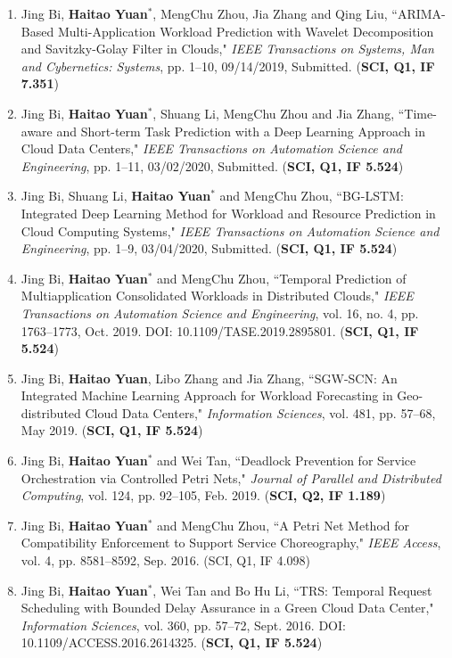 \documentclass[margin,line]{res}
\begin{document}
\begin{resume}
\begin{enumerate}
\item Jing Bi, \textbf{Haitao Yuan$^{*}$}, MengChu Zhou, Jia Zhang and Qing Liu, ``ARIMA-Based Multi-Application Workload Prediction with Wavelet Decomposition and Savitzky-Golay Filter in Clouds," \emph{IEEE Transactions on Systems, Man and Cybernetics: Systems}, pp. 1--10, 09/14/2019, Submitted. (\textbf{SCI, Q1, IF 7.351})
\item Jing Bi, \textbf{Haitao Yuan$^{*}$}, Shuang Li, MengChu Zhou and Jia Zhang, ``Time-aware and Short-term Task Prediction with a Deep Learning Approach in Cloud Data Centers," \emph{IEEE Transactions on Automation Science and Engineering}, pp. 1--11, 03/02/2020, Submitted. (\textbf{SCI, Q1, IF 5.524})
\item Jing Bi, Shuang Li, \textbf{Haitao Yuan$^{*}$} and MengChu Zhou, ``BG-LSTM: Integrated Deep Learning Method for Workload and Resource Prediction in Cloud Computing Systems," \emph{IEEE Transactions on Automation Science and Engineering}, pp. 1--9, 03/04/2020, Submitted. (\textbf{SCI, Q1, IF 5.524})
\item Jing Bi, \textbf{Haitao Yuan$^{*}$} and MengChu Zhou, ``Temporal Prediction of Multiapplication Consolidated Workloads in Distributed Clouds," \emph{IEEE Transactions on Automation Science and Engineering}, vol. 16, no. 4, pp. 1763--1773, Oct. 2019. DOI: 10.1109/TASE.2019.2895801. (\textbf{SCI, Q1, IF 5.524})
\item Jing Bi, \textbf{Haitao Yuan}, Libo Zhang and Jia Zhang, ``SGW-SCN: An Integrated Machine Learning Approach for Workload Forecasting in Geo-distributed Cloud Data Centers," \emph{Information Sciences}, vol. 481, pp. 57--68, May 2019. (\textbf{SCI, Q1, IF 5.524})
\item Jing Bi, \textbf{Haitao Yuan$^{*}$} and Wei Tan, ``Deadlock Prevention for Service Orchestration via Controlled Petri Nets," \emph{Journal of Parallel and Distributed Computing}, vol. 124, pp. 92--105, Feb. 2019. (\textbf{SCI, Q2, IF 1.189})
\item Jing Bi, \textbf{Haitao Yuan$^{*}$} and MengChu Zhou, ``A Petri Net Method for Compatibility Enforcement to Support Service Choreography," \emph{IEEE Access}, vol. 4, pp. 8581--8592, Sep. 2016. (SCI, Q1, IF 4.098)
\item Jing Bi, \textbf{Haitao Yuan$^{*}$}, Wei Tan and Bo Hu Li, ``TRS: Temporal Request Scheduling with Bounded Delay Assurance in a Green Cloud Data Center," \emph{Information Sciences}, vol. 360, pp. 57--72, Sept. 2016. DOI: 10.1109/ACCESS.2016.2614325. (\textbf{SCI, Q1, IF 5.524})

\end{enumerate}
\end{resume}
\end{document}
